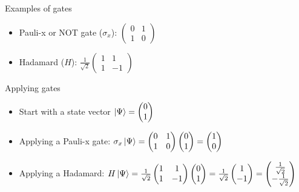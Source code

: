 \documentclass[14pt]{beamer}
\begin{document}
\begin{frame}{Examples of gates}
\begin{itemize}
	\item Pauli-x or NOT gate ($\sigma_x$): $\begin{pmatrix} 0 & 1 \\ 1 & 0 \end{pmatrix}$
	\item Hadamard ($H$): $\frac{1}{\sqrt{2}}\begin{pmatrix} 1 & 1 \\ 1 & -1 \end{pmatrix}$
\end{itemize}
\end{frame}

\begin{frame}{Applying gates}
\begin{itemize}
	\item Start with a state vector $\ket{\Psi} = \begin{pmatrix}0 \\ 1\end{pmatrix}$
	\item Applying a Pauli-x gate: $\sigma_x \ket{\Psi} = \begin{pmatrix} 0 & 1 \\ 1 & 0 \end{pmatrix}\begin{pmatrix}0 \\ 1\end{pmatrix} = \begin{pmatrix}1 \\ 0\end{pmatrix}$
	\item Applying a Hadamard: $H \ket{\Psi} = \frac{1}{\sqrt{2}}\begin{pmatrix} 1 & 1 \\ 1 & -1 \end{pmatrix}\begin{pmatrix}0 \\ 1\end{pmatrix} = \frac{1}{\sqrt{2}}\begin{pmatrix}1 \\ -1\end{pmatrix} = \begin{pmatrix}\frac{1}{\sqrt{2}} \\ -\frac{1}{\sqrt{2}}\end{pmatrix}$
	
\end{itemize}
\end{frame}
\end{document}
